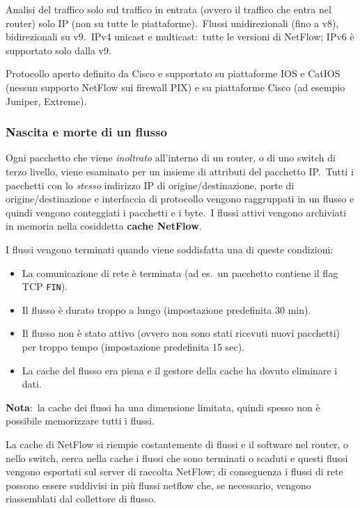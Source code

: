 Analisi del traffico solo sul traffico in entrata (ovvero il traffico che entra nel router) solo IP (non su tutte le piattaforme).\
Flussi unidirezionali (fino a v8), bidirezionali su v9.\
IPv4 unicast e multicast:\ tutte le versioni di NetFlow; IPv6 è supportato solo dalla v9.\

Protocollo aperto definito da Cisco e supportato su piattaforme IOS e CatIOS (nessun supporto NetFlow sui firewall PIX) e su piattaforme Cisco (ad esempio Juniper, Extreme).

\subsubsection{Nascita e morte di un flusso}

Ogni pacchetto che viene \textit{inoltrato} all'interno di un router, o di uno switch di terzo livello, viene esaminato per un insieme di attributi del pacchetto IP.\
Tutti i pacchetti con lo \textit{stesso} indirizzo IP di origine/destinazione, porte di origine/destinazione e interfaccia di protocollo vengono raggruppati in un flusso e quindi vengono conteggiati i pacchetti e i byte.\
I flussi attivi vengono archiviati in memoria nella cosiddetta \textbf{cache NetFlow}.\

I flussi vengono terminati quando viene soddisfatta una di queste condizioni:
\begin{itemize}
    \item La comunicazione di rete è terminata (ad es.\ un pacchetto contiene il flag TCP \texttt{FIN}).
    \item Il flusso è durato troppo a lungo (impostazione predefinita 30 min).
    \item Il flusso non è stato attivo (ovvero non sono stati ricevuti nuovi pacchetti) per troppo tempo (impostazione predefinita 15 sec).
    \item La cache del flusso era piena e il gestore della cache ha dovuto eliminare i dati.
\end{itemize}

\noindent \textbf{Nota}:\ la cache dei flussi ha una dimensione limitata, quindi spesso non è possibile memorizzare tutti i flussi.\

La cache di NetFlow si riempie costantemente di flussi e il software nel router, o nello switch, cerca nella cache i flussi che sono terminati o scaduti e questi flussi vengono esportati sul server di raccolta NetFlow; di conseguenza  i flussi di rete possono essere suddivisi in più flussi netflow che, se necessario, vengono riassemblati dal collettore di flusso.\

